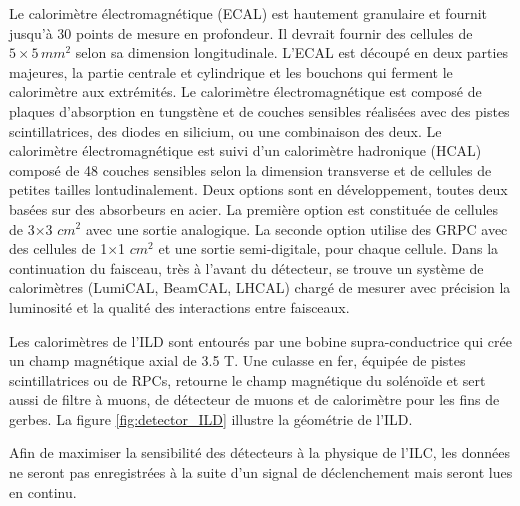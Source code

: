   Le calorim\`etre \'electromagn\'etique (ECAL) est hautement granulaire et fournit jusqu'\`a 30 points de mesure en profondeur. Il devrait fournir des cellules de $5 \times 5 \, mm^2$ selon sa dimension longitudinale. L'ECAL est d\'ecoup\'e en deux parties majeures, la partie centrale et cylindrique et les bouchons qui ferment le calorim\`etre aux extr\'emités. Le calorim\`etre \'electromagn\'etique est compos\'e de plaques d'absorption en tungst\`ene et de couches sensibles r\'ealis\'ees avec des pistes scintillatrices, des diodes en silicium, ou une combinaison des deux. Le calorim\`etre \'electromagn\'etique est suivi d'un calorim\`etre hadronique (HCAL) compos\'e de 48 couches sensibles selon la dimension transverse et de cellules de petites tailles lontudinalement. Deux options sont en développement, toutes deux bas\'ees sur des absorbeurs en acier. La premi\`ere option est constitu\'ee de cellules de 3$\times$3 $cm^2$ avec une sortie analogique. La seconde option utilise des GRPC avec des cellules de 1$\times$1 $cm^2$ et une sortie semi-digitale, pour chaque cellule. Dans la continuation du faisceau, tr\`es \`a l'avant du d\'etecteur, se trouve un syst\`eme de calorim\`etres (LumiCAL, BeamCAL, LHCAL) charg\'e de mesurer avec pr\'ecision la luminosit\'e et la qualit\'e des interactions entre faisceaux.
  
  \medskip
  
  Les calorim\`etres de l'ILD sont entour\'es par une bobine supra-conductrice qui cr\'ee un champ magn\'etique axial de 3.5 T. Une culasse en fer, \'equip\'ee de pistes scintillatrices ou de RPCs, retourne le champ magn\'etique du sol\'eno\"ide et sert aussi de filtre \`a muons, de d\'etecteur de muons et de calorim\`etre pour les fins de gerbes. La figure \ref{fig:detector_ILD} illustre la g\'eom\'etrie de l'ILD.
  
  \medskip

  Afin de maximiser la sensibilit\'e des d\'etecteurs \`a la physique de l'ILC, les donn\'ees ne seront pas enregistr\'ees \`a la suite d'un signal de d\'eclenchement mais seront lues en continu.

%   
  
